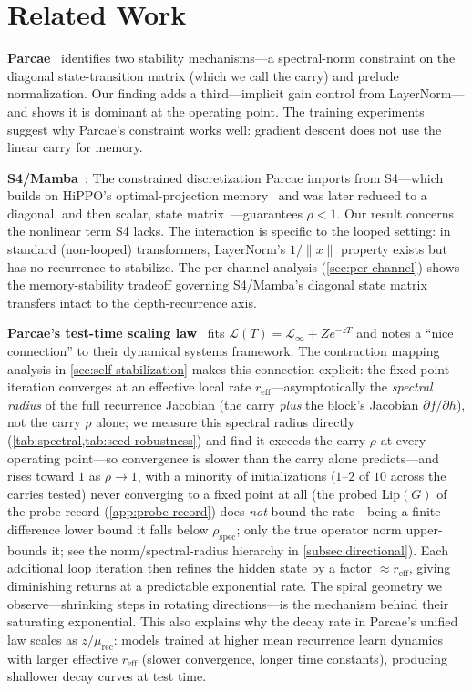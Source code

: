 \documentclass[11pt]{article}
\begin{document}
\section{Related Work}
\label{sec:related}

\textbf{Parcae}~\citep{parcae2026} identifies two stability mechanisms---a spectral-norm constraint on the diagonal state-transition matrix (which we call the carry) and prelude normalization. Our finding adds a third---implicit gain control from LayerNorm---and shows it is dominant at the operating point. The training experiments suggest why Parcae's constraint works well: gradient descent does not use the linear carry for memory.

\textbf{S4/Mamba}~\citep{s4,mamba}: The constrained discretization Parcae imports from S4---which builds on HiPPO's optimal-projection memory~\citep{hippo} and was later reduced to a diagonal, and then scalar, state matrix~\citep{s4d,mamba2}---guarantees $\rho < 1$. Our result concerns the nonlinear term S4 lacks. The interaction is specific to the looped setting: in standard (non-looped) transformers, LayerNorm's $1/\|x\|$ property exists but has no recurrence to stabilize. The per-channel analysis (\cref{sec:per-channel}) shows the memory-stability tradeoff governing S4/Mamba's diagonal state matrix transfers intact to the depth-recurrence axis.

\textbf{Parcae's test-time scaling law}~\citep[§5.3]{parcae2026} fits $\mathcal{L}(T) = \mathcal{L}_\infty + Ze^{-zT}$ and notes a ``nice connection'' to their dynamical systems framework. The contraction mapping analysis in \cref{sec:self-stabilization} makes this connection explicit: the fixed-point iteration converges at an effective local rate $r_\text{eff}$---asymptotically the \emph{spectral radius} of the full recurrence Jacobian (the carry \emph{plus} the block's Jacobian $\partial f/\partial h$), not the carry $\rho$ alone; we measure this spectral radius directly (\cref{tab:spectral,tab:seed-robustness}) and find it exceeds the carry $\rho$ at every operating point---so convergence is slower than the carry alone predicts---and rises toward $1$ as $\rho \to 1$, with a minority of initializations ($1$--$2$ of $10$ across the carries tested) never converging to a fixed point at all (the probed $\text{Lip}(G)$ of the probe record (\cref{app:probe-record}) does \emph{not} bound the rate---being a finite-difference lower bound it falls below $\rho_{\text{spec}}$; only the true operator norm upper-bounds it; see the norm/spectral-radius hierarchy in \cref{subsec:directional}). Each additional loop iteration then refines the hidden state by a factor $\approx r_\text{eff}$, giving diminishing returns at a predictable exponential rate. The spiral geometry we observe---shrinking steps in rotating directions---is the mechanism behind their saturating exponential. This also explains why the decay rate in Parcae's unified law scales as $z/\mu_\text{rec}$: models trained at higher mean recurrence learn dynamics with larger effective $r_\text{eff}$ (slower convergence, longer time constants), producing shallower decay curves at test time.
\end{document}
